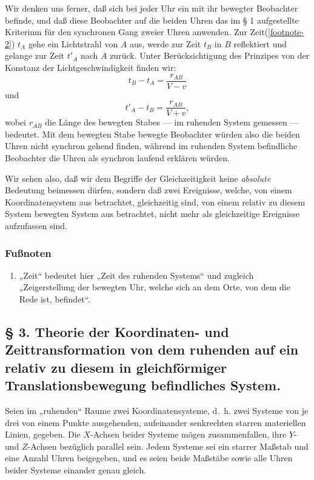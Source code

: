 \documentclass[17pt]{webarticle}       %
\begin{document}
Wir denken uns ferner, daß sich bei jeder Uhr ein mit ihr bewegter Beobachter befinde, und daß diese Beobachter auf die beiden Uhren das im § 1 aufgestellte Kriterium für den synchronen Gang zweier Uhren anwenden. Zur Zeit(\ref{footnote-2}) \( t_A \) gehe ein Lichtstrahl von \( A \) aus, werde zur Zeit \( t_B \) in \( B \) reflektiert und gelange zur Zeit \( t'_A \) nach \( A \) zurück. Unter Berücksichtigung des Prinzipes von der Konstanz der Lichtgeschwindigkeit finden wir:
\[
t_B - t_A = \frac{r_{AB}}{V - v}
\]
und
\[
t'_A - t_B = \frac{r_{AB}}{V + v},
\]
wobei \( r_{AB} \) die Länge des bewegten Stabes — im ruhenden System gemessen — bedeutet. Mit dem bewegten Stabe bewegte Beobachter würden also die beiden Uhren nicht synchron gehend finden, während im ruhenden System befindliche Beobachter die Uhren als synchron laufend erklären würden.

Wir sehen also, daß wir dem Begriffe der Gleichzeitigkeit keine \emph{absolute} Bedeutung beimessen dürfen, sondern daß zwei Ereignisse, welche, von einem Koordinatensystem aus betrachtet, gleichzeitig sind, von einem relativ zu diesem System bewegten System aus betrachtet, nicht mehr als gleichzeitige Ereignisse aufzufassen sind.

\subsubsection*{Fußnoten}

\begin{enumerate}
\item\label{footnote-2} „Zeit“ bedeutet hier „Zeit des ruhenden Systems“ und zugleich „Zeigerstellung der bewegten Uhr, welche sich an dem Orte, von dem die Rede ist, befindet“.
\end{enumerate}

\subsection*{§ 3. Theorie der Koordinaten- und Zeittransformation von dem ruhenden auf ein relativ zu diesem in gleichförmiger Translationsbewegung befindliches System.}

Seien im „ruhenden“ Raume zwei Koordinatensysteme, d.~h. zwei Systeme von je drei von einem Punkte ausgehenden, aufeinander senkrechten starren materiellen Linien, gegeben. Die \( X \)-Achsen beider Systeme mögen zusammenfallen, ihre \( Y \)- und \( Z \)-Achsen bezüglich parallel sein. Jedem Systeme sei ein starrer Maßstab und eine Anzahl Uhren beigegeben, und es seien beide Maßstäbe sowie alle Uhren beider Systeme einander genau gleich.
\end{document}
